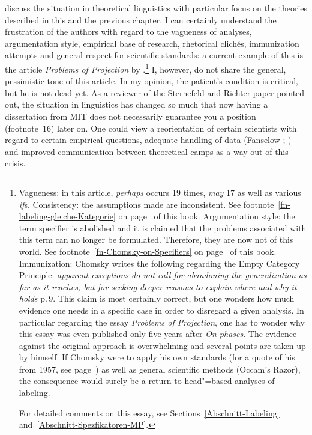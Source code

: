 {\citet{SR2012a} discuss the situation in theoretical linguistics with particular focus on the
theories described in this and the previous chapter. I can certainly understand the frustration of
the authors with regard to the vagueness of analyses, argumentation style, empirical base of
research, rhetorical clich\'{e}s, immunization attempts and general respect for scientific
standards: a current example of this is the article \emph{Problems of Projection} by \citet{Chomsky2013a}.\footnote{%
  Vagueness: in this article, \emph{perhaps} occurs 19 times, \emph{may} 17 as well as various \emph{if}s. Consistency: the assumptions made
  are inconsistent. See footnote~\ref{fn-labeling-gleiche-Kategorie} on
  page~\pageref{fn-labeling-gleiche-Kategorie} of this book. Argumentation style: the
  term specifier is abolished and it is claimed that the problems associated with this term can no longer be formulated. Therefore, they are now
  not of this world. See footnote~\ref{fn-Chomsky-on-Specifiers} on
  page~\pageref{fn-Chomsky-on-Specifiers} of this book. Immunization: Chomsky writes the following regarding the Empty Category Principle:
  \emph{apparent exceptions do not call for abandoning the generalization as far as it reaches, but for seeking
  deeper reasons to explain where and why it holds} p.\,9. This claim is most certainly correct, but one wonders how much evidence one needs
  in a specific case in order to disregard a given analysis. In particular regarding the essay \emph{Problems of Projection}, one has to wonder
  why this essay was even published only five years after \emph{On phases}. The evidence against the original approach is overwhelming and several
  points are taken up by \citet{Chomsky2013a} himself. If Chomsky were to apply his own standards (for a quote of his from 1957, see
  page~\pageref{quote-Chomsky-Formalisierung}) as well as general scientific methods (Occam's Razor), the consequence would surely be a return
  to head"=based analyses of labeling.

  For detailed comments on this essay, see Sections~\ref{Abschnitt-Labeling} and~\ref{Abschnitt-Spezfikatoren-MP}.
}
I, however, do not share the general, pessimistic tone of this article. In my opinion, the patient's condition is critical, but he is not dead yet.
As a reviewer of the Sternefeld and Richter paper pointed out, the situation in linguistics has changed so much that now having a dissertation from 
MIT does not necessarily guarantee you a position (footnote~16) later on. One could view a reorientation of certain scientists with regard to certain empirical
questions, adequate handling of data (Fanselow \citeyear{Fanselow2004b}; \citeyear[]{Fanselow2009a}) and improved communication between
theoretical camps as a way out of this crisis.

}
